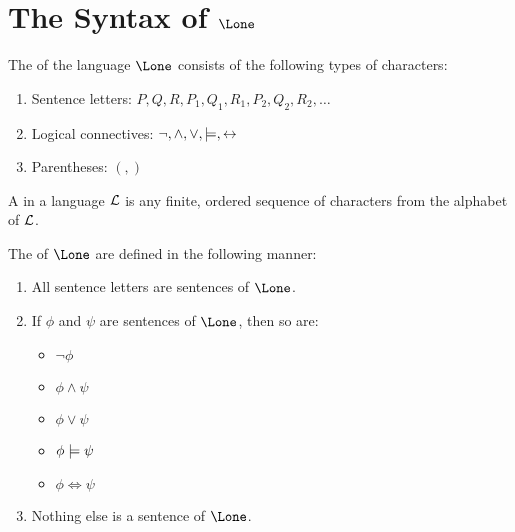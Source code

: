\documentclass{styles/tufte}
\begin{document}
\section{The Syntax of $\Lone$}
  
  \begin{definition}{}{}
    The  of the language $\Lone$ consists of the following types of characters:
    \begin{enumerate}
      \item Sentence letters: $P, Q, R, P_1, Q_1, R_1, P_2, Q_2, R_2, \dots$
      \item Logical connectives: $\neg, \land, \lor, \entails, \iff$
      \item Parentheses: $(, )$
    \end{enumerate}
  \end{definition}
  
  \begin{definition}{}{}
    A  in a language $\mathcal{L}$ is any finite, ordered sequence of characters from the alphabet of $\mathcal{L}$.
  \end{definition}
  
  \begin{definition}{}{}
    The  of $\Lone$ are defined in the following manner:
    \begin{enumerate}
      \item All sentence letters are sentences of $\Lone$.
      \item If $\phi$ and $\psi$ are sentences of $\Lone$, then so are:
        \begin{itemize}
          \item $\neg\phi$
          \item $\phi \land \psi$
          \item $\phi \lor \psi$
          \item $\phi \entails \psi$
          \item $\phi \iff \psi$
        \end{itemize}
      \item Nothing else is a sentence of $\Lone$.
    \end{enumerate}
  \end{definition}
\end{document}

